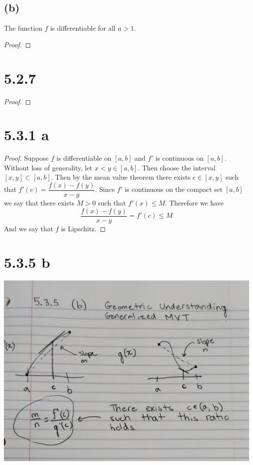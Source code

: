 \documentclass{article}
\begin{document}
\subsection*{(b)}
The function $f$ is differentiable for all $a >1$.
\begin{proof}

\end{proof}

\section*{5.2.7}
\begin{proof}
\end{proof}

\section*{5.3.1 a}
\begin{proof}
Suppose $f$ is differentiable on $[a,b]$ and $f'$ is continuous on $[a,b]$. Without loss of generality, let $x < y \in [a,b]$. Then choose the interval $[x,y] \subset [a,b]$. Then by the mean value theorem there exists $c \in [x,y]$ such that $f'(c) = \dfrac{f(x)-f(y)}{x-y}$. Since $f'$ is continuous on the compact set $[a,b]$ we say that there exists $M>0$ such that $f'(x) \leqslant M$. Therefore we have
\[ \frac{f(x) - f(y)}{x-y} = f'(c) \leqslant M \]
And we say that $f$ is Lipschitz.
\end{proof}

\section*{5.3.5 b}
\includegraphics[scale=0.1]{pic.jpg}
\end{document}
